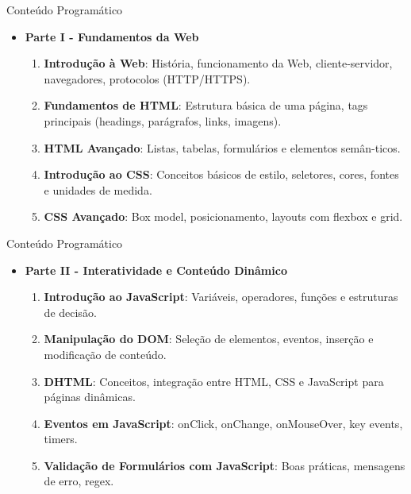 \documentclass{beamer}
\begin{document}
\begin{frame}{Conteúdo Programático}
    \begin{itemize}
        \item \textbf{Parte I - Fundamentos da Web}
            \begin{enumerate}
                \justifying
                \item \textbf{Introdução à Web}: História, funcionamento da Web, cliente-servidor, navegadores, protocolos (HTTP/HTTPS).
                \item \textbf{Fundamentos de HTML}: Estrutura básica de uma página, tags principais (headings, parágrafos, links, imagens).
                \item \textbf{HTML Avançado}: Listas, tabelas, formulários e elementos semân-ticos.
                \item \textbf{Introdução ao CSS}: Conceitos básicos de estilo, seletores, cores, fontes e unidades de medida.
                \item \textbf{CSS Avançado}: Box model, posicionamento, layouts com flexbox e grid.
            \end{enumerate}
    \end{itemize}
\end{frame}

\begin{frame}{Conteúdo Programático}
    \begin{itemize}
        \justifying
        \item \textbf{Parte II - Interatividade e Conteúdo Dinâmico}
            \begin{enumerate}
                \justifying
                \item \textbf{Introdução ao JavaScript}: Variáveis, operadores, funções e estruturas de decisão.
                \item \textbf{Manipulação do DOM}: Seleção de elementos, eventos, inserção e modificação de conteúdo.
                \item \textbf{DHTML}: Conceitos, integração entre HTML, CSS e JavaScript para páginas dinâmicas.
                \item \textbf{Eventos em JavaScript}: onClick, onChange, onMouseOver, key events, timers.
                \item \textbf{Validação de Formulários com JavaScript}: Boas práticas, mensagens de erro, regex.
            \end{enumerate}
    \end{itemize}
\end{frame}
\end{document}
